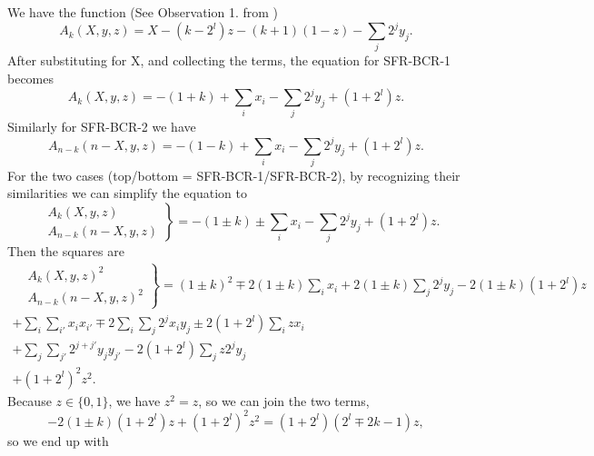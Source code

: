 \documentclass[a4paper,english,notitlepage,longbibliography,showpacs,preprintnumbers,amsmath,amssymb,aps,prx,nofootinbib,12pt,superscriptaddress]{revtex4-1}
\begin{document}
\noindent We have the function (See Observation 1. from \cite{Boros2018QuadratizationsOS}) %
\begin{equation}
\label{eq:Ak}
A_k(X,y,z) = X - (k-2^l)z - (k+1)(1-z) - \sum_{j}2^jy_j.
\end{equation}
After substituting for X, and collecting the terms, the equation for SFR-BCR-1 becomes
\begin{equation}
\label{eq:Ak1}
A_k(X,y,z) = -(1+k) +\sum_i x_i - \sum_{j}2^jy_j + (1+2^l)z.
\end{equation}
Similarly for SFR-BCR-2 we have
\begin{equation}
\label{eq:Ak2}
A_{n-k}({n-X},y,z) = -(1-k) +\sum_i x_i - \sum_{j}2^jy_j + (1+2^l)z.
\end{equation}
For the  two cases
(top/bottom = SFR-BCR-1/SFR-BCR-2),
by recognizing their similarities we can simplify the equation to
\begin{equation}
\label{eq:Ak12}
\left.\begin{aligned}
&A_k(X,y,z) \\
&A_{n-k}({n-X},y,z)
\end{aligned}\right\}
= -(1\pm k) \pm \sum_i x_i - \sum_j 2^jy_j + (1+2^l)z.
\end{equation}
Then the squares are
\begin{equation}
\label{eq:Ak12sq}
\begin{split}
\left.\begin{aligned}
&A_k(X,y,z)^2 \\
&A_{n-k}({n-X},y,z)^2
\end{aligned}\right\}
= (1\pm k)^2 \mp2(1\pm k)\sum_i x_i +2(1\pm k)\sum_j 2^jy_j -2(1\pm k)(1+2^l)z & \\
+ \sum_i\sum_{i'} x_ix_{i'} \mp2\sum_i\sum_j 2^jx_iy_j \pm2 (1+2^l)\sum_i zx_i & \\
+ \sum_j\sum_{j'} 2^{j+j'}y_jy_{j'} - 2(1+2^l)\sum_j z 2^jy_j & \\
+ (1+2^l)^2z^2. &
\end{split}
\end{equation}
Because $z\in\{0,1\}$, we have $z^2=z$, so we can join the two terms,
\begin{equation}
-2(1\pm k)(1+2^l)z + (1+2^l)^2z^2 = (1+2^l)(2^l\mp2k-1)z,
\end{equation}
so we end up with
\end{document}
